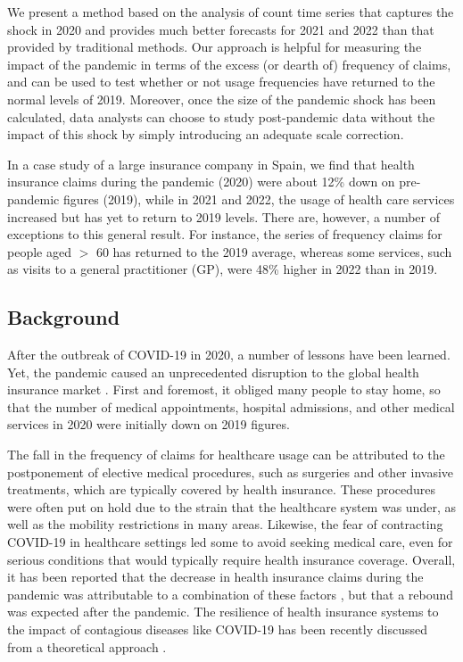 \documentclass[]{risa}
\begin{document}
We present a method based on the analysis of count time series that captures the shock in 2020 and provides much better forecasts for 2021 and 2022 than that provided by traditional methods. Our approach is helpful for measuring the impact of the pandemic in terms of the excess (or dearth of) frequency of claims, and can be used to test whether or not usage frequencies have returned to the normal levels of 2019. Moreover, once the size of the pandemic shock has been calculated, data analysts can choose to study post-pandemic data without the impact of this shock by simply introducing an adequate scale correction.

In a case study of a large insurance company in Spain, we find that health insurance claims during the pandemic (2020) were about 12\% down on pre-pandemic figures (2019), while in 2021 and 2022, the usage of health care services increased but has yet to return to 2019 levels. There are, however, a number of exceptions to this general result. For instance, the series of frequency claims for people aged $>$ 60 has returned to the 2019 average, whereas some services, such as visits to a general practitioner (GP), were 48\% higher in 2022 than in 2019.

\subsection{Background}
After the outbreak of COVID-19 in 2020, a number of lessons have been learned. Yet, the pandemic caused an unprecedented disruption to the global health insurance market \cite{przybytniowski2022risk, szczygielski2022impact}. First and foremost, it obliged many people to stay home, so that the number of medical appointments, hospital admissions, and other medical services in 2020 were initially down on 2019 figures. 

The fall in the frequency of claims for healthcare usage can be attributed to the postponement of elective medical procedures, such as surgeries and other invasive treatments, which are typically covered by health insurance. These procedures were often put on hold due to the strain that the healthcare system was under, as well as the mobility restrictions in many areas. Likewise, the fear of contracting COVID-19 in healthcare settings led some to avoid seeking medical care, even for serious conditions that would typically require health insurance coverage. Overall, it has been reported that the decrease in health insurance claims during the pandemic was attributable to a combination of these factors \cite{plott2020unexpected}, but that a rebound was expected after the pandemic. The resilience of health insurance systems to the impact of contagious diseases like COVID-19 has been recently discussed from a theoretical approach \cite{hong_health_2023}.
\end{document}
